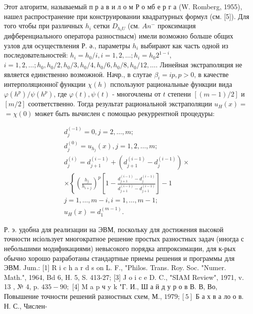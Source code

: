 \documentclass[10pt]{article}
\begin{document}
Этот алгоритм, называемый п р а в и л о м Р о мб е р г а (W. Romberg, 1955), нашел распространение при конструировании квадратурных формул (см. [5]). Для того чтобы при различных $h_{i}$ сетки $D_{h_{i} U}$ (см. $A n^{-}$ проксимация дифберенциального оператора разностнысм) имели возможно больше общих узлов для осуществления Р. ә., параметры $h_{i}$ выбирают как часть одной из последовательностей: $h_{i}=h_{0} / i, i=1,2, \ldots ; h_{i}=h_{0} 2^{1-i}$, $i=1,2, \ldots ; h_{0}, h_{0} / 2, h_{0} / 3, h_{0} / 4, h_{0} / 6, h_{0} / 8, h_{0} / 12, \ldots$. Линейная экстраполяция не является единственно возможноӥ. Начр., в слутае $\beta_{i}=i p, p>0$, в качестве интерполяционної̈ функции $\chi(h)$ пспользуют рациональные функции вида $\varphi\left(h^{p}\right) / \psi\left(h^{p}\right)$, где $\varphi(t), \psi(t)$ - многочлены от $t$ степени $[(m-1) / 2]$ и $[m / 2]$ соответственно. Тогда результат рациональной экстраполяции $u_{H}(x)=$ $=\chi(0)$ может быть вычислен с помощью рекуррентной процедуры:



\[

\begin{gathered}

d_{j}^{(-1)}=0, j=2, \ldots, m ; \\

d_{j}^{(0)}=u_{h_{j}}(x), j=1,2, \ldots, m ; \\

d_{j}^{(i)}=d_{j+1}^{(i-1)}+\left(d_{j+1}^{(i-1)}-d_{j}^{(i-1)}\right) \times \\

\times\left\{\left(\frac{h_{j}}{h_{i+j}}\right)^{p}\left[1-\frac{d_{j+1}^{(i-1)}-d_{j}^{(i-1)}}{d_{j+1}^{(i-1)}-d_{j+1}^{(i-1)}}\right]-1\right. \\

j=1, \ldots, m-i, i=1, \ldots, m-1 ; \\

u_{H}(x)=d_{1}^{(m-1)} .

\end{gathered}

\]



Р. э. удобна для реализации на ЭВМ, поскольку для достижения высокой точности исіользует многократное решение простых разностных задач (иногда с небольшими модификациями) невысокого порядка аппроксимации, для к-рых обычно хорошо разработаны стандартные приемы решения и программы для ЭВМ. Jum.: [1] R i c h a r d s on L. F., "Philos. Trans. Roy. Soc. "Numer. Math.", 1964, Bd 6, H. 5, S. 413-27; [3] J o i c e D. C., "SIAM Review", 1971, v. 13 , № 4, p. $435-90 ;$ [4] M a p ч y k "Г. И., Ш а й д у р о в В. В, Во, Повышение точности решений разностных схем, М., $1979 ;[5]$ Б а х в а ло о в. Н. С., Числен-
\end{document}
